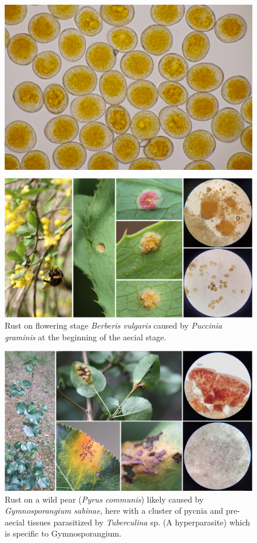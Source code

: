 \documentclass[10pt,dvipsnames,ignorenonframetext,aspectratio=169]{beamer}
\begin{document}
\begin{frame}{}
\begin{figure}
\begin{columns}
\includegraphics[width=0.6\linewidth]{../images/FYCo7NrXkAAOJZh}\end{columns}\end{figure}
\end{frame}

\begin{frame}{}
\protect\hypertarget{section-8}{}
\begin{figure}
\includegraphics[width=0.36\linewidth]{../images/FRruRoiX0AE_dF0} \caption{Rust on flowering stage \textit{Berberis vulgaris} caused by \textit{Puccinia graminis} at the beginning of the aecial stage.}\label{fig:berberis-rust}
\end{figure}

\begin{figure}
\includegraphics[width=0.38\linewidth]{../images/Fa1rQDGWAAAa8pu} \caption{Rust on a wild pear (\textit{Pyrus communis}) likely caused by \textit{Gymnosporangium sabinae}, here with a cluster of pycnia and pre-aecial tissues parasitized by \textit{Tuberculina} sp. (A hyperparasite) which is specific to Gymnosporangium.}\label{fig:pear-rust}
\end{figure}
\end{frame}
\end{document}
